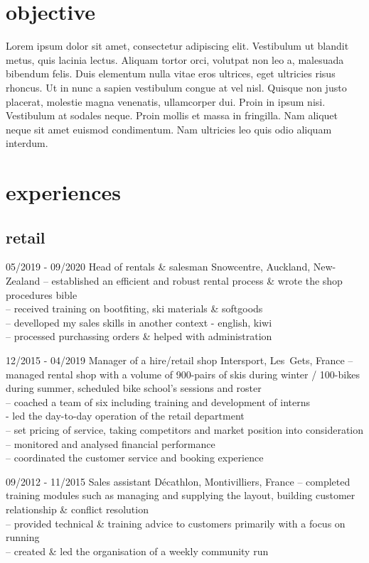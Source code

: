 \documentclass[a4paper]{farangoth-cv}
\begin{document}
\section{objective}
Lorem ipsum dolor sit amet, consectetur adipiscing elit. Vestibulum ut blandit metus, quis lacinia lectus. Aliquam tortor orci, volutpat non leo a, malesuada bibendum felis. Duis elementum nulla vitae eros ultrices, eget ultricies risus rhoncus. Ut in nunc a sapien vestibulum congue at vel nisl. Quisque non justo placerat, molestie magna venenatis, ullamcorper dui. Proin in ipsum nisi. Vestibulum at sodales neque. Proin mollis et massa in fringilla. Nam aliquet neque sit amet euismod condimentum. Nam ultricies leo quis odio aliquam interdum.

\section{experiences}
\subsection{retail}
\begin{entrylist}
  \entry%
  {05/2019 \-- 09/2020}
  {Head of rentals \& salesman}
  {Snowcentre, \mbox{Auckland}, \mbox{New-Zealand}}
  {
    \--- established an efficient and robust rental process \& wrote the shop procedures bible\\
    \--- received training on bootfiting, ski materials \& softgoods\\
    \--- develloped my sales skills in another context \-- english, kiwi\\
    \--- processed purchassing orders \& helped with administration\\
  }
  
  \entry%
  {12/2015 \-- 04/2019}
  {Manager of a hire/retail shop}
  {Intersport, \mbox{Les Gets}, \mbox{France}}
  {
    \--- managed rental shop with a volume of 900-pairs of skis during winter / 100-bikes during summer, scheduled bike school's sessions and roster\\
    \--- coached a team of six including training and development of interns\\
    \-- led the day-to-day operation of the retail department\\
    \--- set pricing of service, taking competitors and market position into consideration\\
    \--- monitored and analysed financial performance\\
    \--- coordinated the customer service and booking experience
  }

  \entry%
  {09/2012 \-- 11/2015}
  {Sales assistant}
  {Décathlon, \mbox{Montivilliers}, \mbox{France}}
  {%
    \--- completed training modules such as managing and supplying the layout, building customer relationship \& conflict resolution\\
    \--- provided technical \& training advice to customers primarily with a focus on running\\
    \--- created \& led the organisation of a weekly community run
  }
\end{entrylist}
\end{document}
